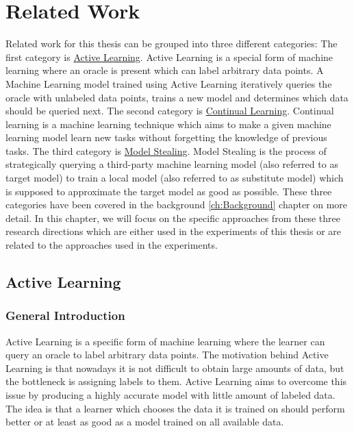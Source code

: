 
\chapter{Related Work}
\label{ch:Related_work}
Related work for this thesis can be grouped into three different categories: The first category is \hyperref[sec:Related_work:Active_Learning]
{Active Learning}. Active Learning is a special form of machine learning where an oracle is present which can label arbitrary data points.
A Machine Learning model trained using Active Learning iteratively queries the oracle with unlabeled data points, trains a new model and
determines which data should be queried next. The second category is \hyperref[sec:Related_work:Continual_Learning]{Continual Learning}.
Continual learning is a machine learning technique which aims to make a given machine learning model learn new tasks without forgetting
the knowledge of previous tasks. The third category is \hyperref[sec:Related_work:Model_Stealing]{Model Stealing}. Model Stealing is the process
of strategically querying a third-party machine learning model (also referred to as target model) to train a local model (also referred to as
substitute model) which is supposed to approximate the target model as good as possible. These three categories have been covered in the background
\ref{ch:Background} chapter on more detail. In this chapter, we will focus on the specific approaches from these three research directions which
are either used in the experiments of this thesis or are related to the approaches used in the experiments.

\section{Active Learning}
\label{sec:Related_work:Active_Learning}
\subsection{General Introduction}
Active Learning is a specific form of machine learning where the learner can query an oracle to label arbitrary data points.
The motivation behind Active Learning is that nowadays it is not difficult to obtain large amounts of data, but the bottleneck
is assigning labels to them. Active Learning aims to overcome this issue by producing a highly accurate model with little amount
 of labeled data. The idea is that a learner which chooses the data it is trained on should perform better or at least as good
 as a model trained on all available data.
